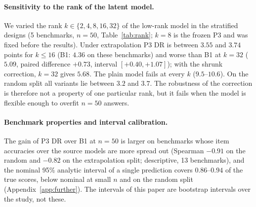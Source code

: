 \paragraph{Sensitivity to the rank of the latent model.}
We varied the rank $k\in\{2,4,8,16,32\}$ of the low-rank model in the stratified designs (5 benchmarks, $n{=}50$, Table~\ref{tab:rank}; $k{=}8$ is the frozen P3 and was fixed before the results). Under extrapolation P3 DR is between $3.55$ and $3.74$ points for $k\le16$ (B1: $4.36$ on these benchmarks) and worse than B1 at $k{=}32$ ($5.09$, paired difference $+0.73$, interval $[+0.40,+1.07]$); with the shrunk correction, $k{=}32$ gives $5.68$. The plain model fails at every $k$ ($9.5$--$10.6$). On the random split all variants lie between $3.2$ and $3.7$. The robustness of the correction is therefore not a property of one particular rank, but it fails when the model is flexible enough to overfit $n{=}50$ answers.

\paragraph{Benchmark properties and interval calibration.}
The gain of P3 DR over B1 at $n{=}50$ is larger on benchmarks whose item accuracies over the source models are more spread out (Spearman $-0.91$ on the random and $-0.82$ on the extrapolation split; descriptive, 13 benchmarks), and the nominal 95\% analytic interval of a single prediction covers $0.86$--$0.94$ of the true scores, below nominal at small $n$ and on the random split (Appendix~\ref{app:further}). The intervals of this paper are bootstrap intervals over the study, not these.

